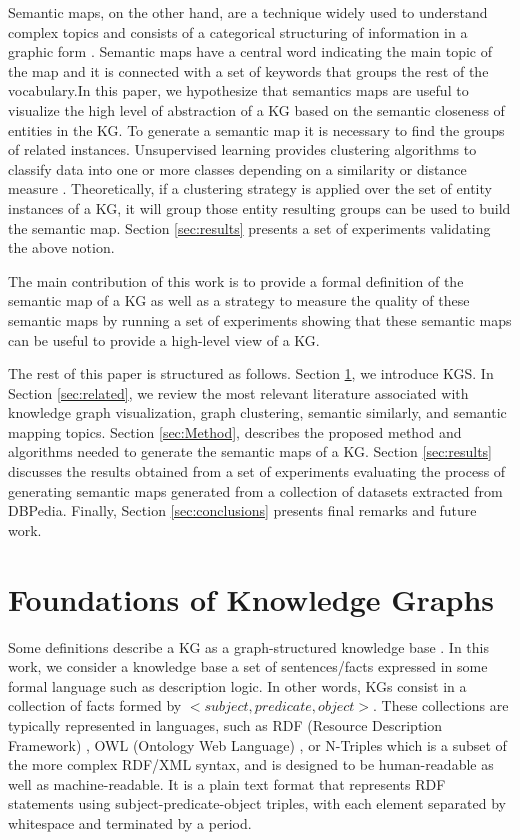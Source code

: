 \documentclass{ieeeaccess}
\begin{document}
Semantic maps, on the other hand, are a technique widely
used to understand complex topics and consists of a 
categorical structuring of information in a graphic form 
\cite{johnson1986semantic}. Semantic maps have a central
word indicating the main topic of the map and it is
connected with a set of keywords that groups the rest
of the vocabulary.In this paper, we hypothesize that 
semantics maps are useful to visualize the high level 
of abstraction of a KG based on the semantic closeness of 
entities in the KG. To generate a semantic map it is 
necessary to find the groups of related instances. Unsupervised
learning provides clustering algorithms to classify
data into one or more classes depending on a similarity
or distance  measure \cite{SCHAEFFER200727}. Theoretically, 
if a clustering strategy is applied over the set of 
entity instances of a KG, it will group those entity
resulting groups can be used to build the semantic 
map. Section \ref{sec:results} presents a set of 
experiments validating the above notion.

The main contribution of this work is to provide a 
formal definition of the semantic map of a KG as well
as a strategy to measure the quality of these semantic 
maps by running a set of experiments showing that 
these semantic maps can be useful to provide a high-level
view of a KG.

The rest of this paper is structured as follows. 
Section \ref{sec:KG}, we introduce KGS. In Section
\ref{sec:related}, we review the most relevant literature
associated with knowledge graph visualization, graph
clustering, semantic similarly, and semantic mapping
topics. Section \ref{sec:Method}, describes the proposed
method and algorithms needed to generate the semantic
maps of a KG. Section \ref{sec:results} discusses the
results obtained from a set of experiments evaluating 
the process of generating semantic maps generated 
from a collection of datasets extracted from 
DBPedia. Finally, Section \ref{sec:conclusions} presents
final remarks and future work.

\section{Foundations of Knowledge Graphs}
\label{sec:KG}

Some definitions describe a KG as a graph-structured
knowledge base \cite{nickel2015review, 
seufert2016instant}. In this work, we consider a knowledge
base a set of sentences/facts expressed in some 
formal language such as description logic. In other words, 
KGs consist in a collection of facts formed by $<subject,
predicate,object>$. These collections are typically 
represented in languages, such as RDF (Resource Description
Framework) \cite{RDF}, OWL (Ontology Web Language) \cite{OWL},
or N-Triples which is a subset of the more complex RDF/XML syntax,
and is designed to be human-readable as well as 
machine-readable. It is a plain text format that represents 
RDF statements using subject-predicate-object triples, with
each element separated by whitespace and terminated by a 
period.
\end{document}
